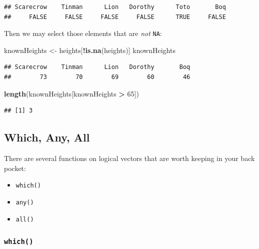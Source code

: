 \documentclass[]{book}
\makeatletter
\newenvironment{Shaded}{\begin{snugshade}}{\end{snugshade}}
\newcommand{\KeywordTok}[1]{\textcolor[rgb]{0.13,0.29,0.53}{\textbf{#1}}}
\newcommand{\DecValTok}[1]{\textcolor[rgb]{0.00,0.00,0.81}{#1}}
\newcommand{\StringTok}[1]{\textcolor[rgb]{0.31,0.60,0.02}{#1}}
\newcommand{\OperatorTok}[1]{\textcolor[rgb]{0.81,0.36,0.00}{\textbf{#1}}}
\newcommand{\NormalTok}[1]{#1}
\providecommand{\tightlist}{%
  \setlength{\itemsep}{0pt}\setlength{\parskip}{0pt}}
\newenvironment{kframe}{%
\medskip{}
\setlength{\fboxsep}{.8em}
 \def\at@end@of@kframe{}%
 \ifinner\ifhmode%
  \def\at@end@of@kframe{\end{minipage}}%
  \begin{minipage}{\columnwidth}%
 \fi\fi%
 \def\FrameCommand##1{\hskip\@totalleftmargin \hskip-\fboxsep
 \colorbox{shadecolor}{##1}\hskip-\fboxsep
     \hskip-\linewidth \hskip-\@totalleftmargin \hskip\columnwidth}%
 \MakeFramed {\advance\hsize-\width
   \@totalleftmargin\z@ \linewidth\hsize
   \@setminipage}}%
 {\par\unskip\endMakeFramed%
 \at@end@of@kframe}
\renewenvironment{Shaded}{\begin{kframe}}{\end{kframe}}
\theoremstyle{definition}
\theoremstyle{definition}
\theoremstyle{definition}
\theoremstyle{remark}
\makeatother
\begin{document}
\begin{verbatim}
## Scarecrow    Tinman      Lion   Dorothy      Toto       Boq 
##     FALSE     FALSE     FALSE     FALSE      TRUE     FALSE
\end{verbatim}

Then we may select those elements that are \emph{not} \texttt{NA}:

\begin{Shaded}
\begin{Highlighting}[]
\NormalTok{knownHeights <-}\StringTok{ }\NormalTok{heights[}\OperatorTok{!}\KeywordTok{is.na}\NormalTok{(heights)]}
\NormalTok{knownHeights}
\end{Highlighting}
\end{Shaded}

\begin{verbatim}
## Scarecrow    Tinman      Lion   Dorothy       Boq 
##        73        70        69        60        46
\end{verbatim}

\begin{Shaded}
\begin{Highlighting}[]
\KeywordTok{length}\NormalTok{(knownHeights[knownHeights }\OperatorTok{>}\StringTok{ }\DecValTok{65}\NormalTok{])}
\end{Highlighting}
\end{Shaded}

\begin{verbatim}
## [1] 3
\end{verbatim}

\subsection{Which, Any, All}\label{which-any-all}

There are several functions on logical vectors that are worth keeping in
your back pocket:

\begin{itemize}
\tightlist
\item
  \texttt{which()}
\item
  \texttt{any()}
\item
  \texttt{all()}
\end{itemize}

\subsubsection{\texorpdfstring{\texttt{which()}
}{which() }}\label{which}
\end{document}
